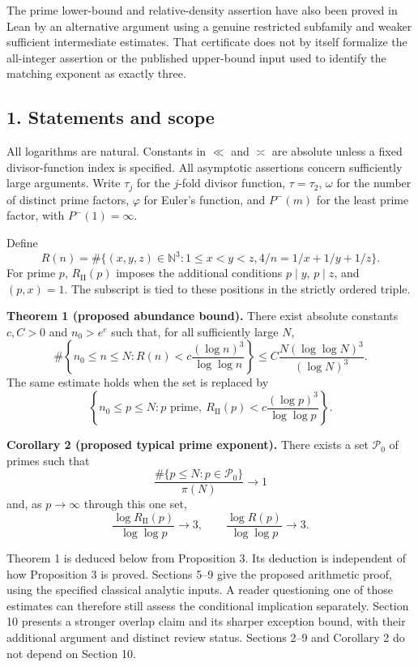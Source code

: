 \documentclass[
  english,
  11pt,
]{article}
\begin{document}
The prime lower-bound and relative-density assertion have also been
proved in Lean by an alternative argument using a genuine restricted
subfamily and weaker sufficient intermediate estimates. That certificate
does not by itself formalize the all-integer assertion or the published
upper-bound input used to identify the matching exponent as exactly
three.

\subsection{1. Statements and scope}\label{statements-and-scope}

All logarithms are natural. Constants in \(\ll\) and \(\asymp\) are
absolute unless a fixed divisor-function index is specified. All
asymptotic assertions concern sufficiently large arguments. Write
\(\tau_j\) for the \(j\)-fold divisor function, \(\tau=\tau_2\),
\(\omega\) for the number of distinct prime factors, \(\varphi\) for
Euler's function, and \(P^-(m)\) for the least prime factor, with
\(P^-(1)=\infty\).

Define \[
R(n)=\#\{(x,y,z)\in\mathbb N^3:1\le x<y<z,
 4/n=1/x+1/y+1/z\}.
\] For prime \(p\), \(R_{\mathrm{II}}(p)\) imposes the additional
conditions \(p\mid y\), \(p\mid z\), and \((p,x)=1\). The subscript is
tied to these positions in the strictly ordered triple.

\textbf{Theorem 1 (proposed abundance bound).} There exist absolute
constants \(c,C>0\) and \(n_0>e^e\) such that, for all sufficiently
large \(N\), \[
\#\left\{n_0\le n\le N:R(n)<c\frac{(\log n)^3}{\log\log n}\right\}
\le C\frac{N(\log\log N)^3}{(\log N)^3}. \tag{1}
\] The same estimate holds when the set is replaced by \[
\left\{n_0\le p\le N:p\text{ prime},\
R_{\mathrm{II}}(p)<c\frac{(\log p)^3}{\log\log p}\right\}. \tag{2}
\]

\textbf{Corollary 2 (proposed typical prime exponent).} There exists a
set \(\mathcal P_0\) of primes such that \[
\frac{\#\{p\le N:p\in\mathcal P_0\}}{\pi(N)}\longrightarrow1
\] and, as \(p\to\infty\) through this one set, \[
\frac{\log R_{\mathrm{II}}(p)}{\log\log p}\longrightarrow3,
\qquad \frac{\log R(p)}{\log\log p}\longrightarrow3. \tag{3}
\]

Theorem 1 is deduced below from Proposition 3. Its deduction is
independent of how Proposition 3 is proved. Sections 5--9 give the
proposed arithmetic proof, using the specified classical analytic
inputs. A reader questioning one of those estimates can therefore still
assess the conditional implication separately. Section 10 presents a
stronger overlap claim and its sharper exception bound, with their
additional argument and distinct review status. Sections 2--9 and
Corollary 2 do not depend on Section 10.
\end{document}
